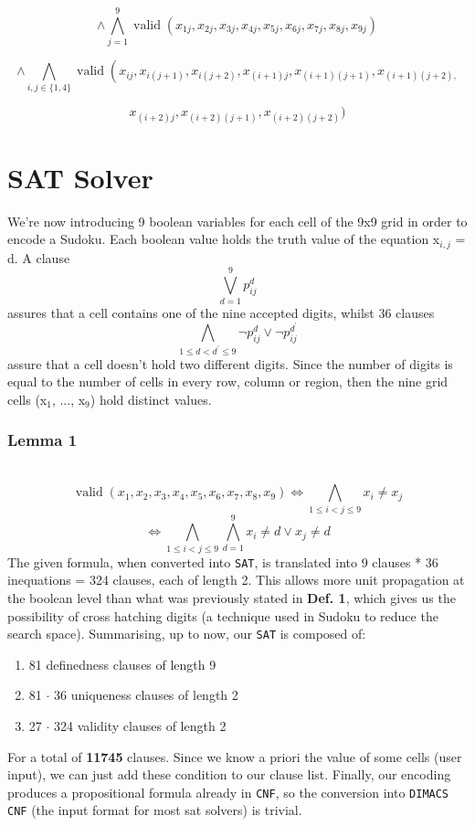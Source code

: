 \documentclass[paper=a4, fontsize=14pt]{scrartcl} %
\begin{document}
	\[ \wedge \bigwedge_{j=1}^{9} \operatorname{valid}\left(x_{1 j}, x_{2 j}, x_{3 j}, x_{4 j}, x_{5 j}, x_{6 j}, x_{7 j}, x_{8 j}, x_{9 j}\right)\]

	\[ \wedge \bigwedge_{i, j \in\{1,4\}} \operatorname{valid}\left(x_{i j}, x_{i(j+1)}, x_{i(j+2)}, x_{(i+1) j}, x_{(i+1)(j+1)}, x_{(i+1)(j+2),}\right.\]

	\[ x_{(i+2) j}, x_{(i+2)(j+1)}, x_{(i+2)(j+2)} )\]

	\section*{SAT Solver}
	We're now introducing 9 boolean variables for each cell of the 9x9 grid in order to encode a Sudoku.
	\newline
	Each boolean value holds the truth value of the equation x$_{i,j}$ = d.
	\newline A clause \[\bigvee_{d=1}^{9} p_{i j}^{d}\] assures that a cell contains one of the nine accepted digits, whilst 36 clauses
	\newline
	\[\bigwedge_{1 \leq d<d^{\prime} \leq 9} \neg p_{i j}^{d} \vee \neg p_{i j}^{d^{\prime}} \]
	assure that a cell doesn't hold two different digits.
	\newline
	Since the number of digits is equal to the number of cells in every row, column or region, then the nine grid cells (x$_1$, ..., x$_9$) hold distinct values.
	\newline
	\subsubsection*{Lemma 1} \\
	\[\operatorname{valid}\left(x_{1}, x_{2}, x_{3}, x_{4}, x_{5}, x_{6}, x_{7}, x_{8}, x_{9}\right) \Longleftrightarrow \bigwedge_{1 \leq i<j \leq 9} x_{i} \neq x_{j}\]
	\[\Longleftrightarrow \bigwedge_{1 \leq i<j \leq 9} \bigwedge_{d=1}^{9} x_{i} \neq d \vee x_{j} \neq d\]
	\newline
The given formula, when converted into \texttt{SAT}, is translated into 9 clauses * 36 inequations = 324 clauses, each of length 2. This allows more unit propagation at the boolean level than what was previously stated in \textbf{Def. 1}, which gives us the possibility of cross hatching digits (a technique used in Sudoku to reduce the search space).
\newline
Summarising, up to now, our \texttt{SAT} is composed of:
	\begin{enumerate}
		\item 81 definedness clauses of length 9
		\item 81 $\cdot$ 36 uniqueness clauses of length 2
		\item 27 $\cdot$ 324 validity clauses of length 2
	\end{enumerate}
For a total of \textbf{11745} clauses.
\newline
Since we know a priori the value of some cells (user input), we can just add these condition to our clause list.
\newline
Finally, our encoding produces a propositional formula already in \texttt{CNF}, so the conversion into \texttt{DIMACS CNF} (the input format for most sat solvers) is trivial.
\end{document}
